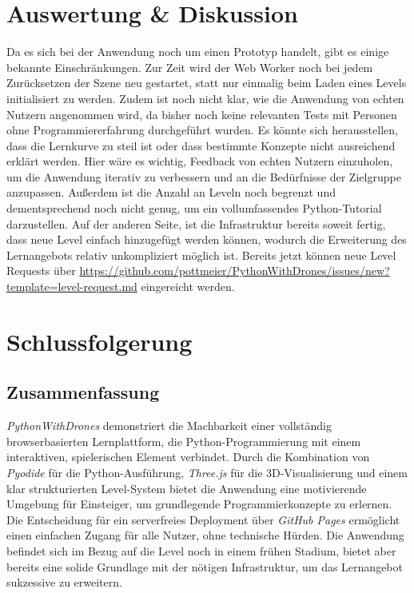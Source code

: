 \documentclass[a4paper,12pt]{article}
\begin{document}
	\section{Auswertung \& Diskussion}
	Da es sich bei der Anwendung noch um einen Prototyp handelt, gibt es einige bekannte Einschränkungen. 
	Zur Zeit wird der Web Worker noch bei jedem Zurücksetzen der Szene neu gestartet, statt 
	nur einmalig beim Laden eines Levels initialisiert zu werden. Zudem ist noch nicht klar, 
	wie die Anwendung von echten Nutzern angenommen wird, da bisher noch keine relevanten Tests 
	mit Personen ohne Programmiererfahrung durchgeführt wurden. Es könnte sich herausstellen, 
	dass die Lernkurve zu steil ist oder dass bestimmte Konzepte nicht ausreichend erklärt werden. 
	Hier wäre es wichtig, Feedback von echten Nutzern einzuholen, um die Anwendung iterativ zu 
	verbessern und an die Bedürfnisse der Zielgruppe anzupassen. Außerdem ist die Anzahl an Leveln 
	noch begrenzt und dementsprechend noch nicht genug, um ein vollumfassendes Python-Tutorial darzustellen. 
	Auf der anderen Seite, ist die Infrastruktur bereits soweit fertig, dass neue Level einfach hinzugefügt 
	werden können, wodurch die Erweiterung des Lernangebots relativ unkompliziert möglich ist. Bereits jetzt 
	können neue Level Requests über \url{https://github.com/pottmeier/PythonWithDrones/issues/new?template=level-request.md} 
	eingereicht werden.

	\section{Schlussfolgerung}
	\subsection{Zusammenfassung}
	\textit{PythonWithDrones} demonstriert die Machbarkeit einer vollständig browserbasierten Lernplattform,
	die Python-Programmierung mit einem interaktiven, spielerischen Element verbindet. Durch die Kombination von 
	\textit{Pyodide} für die Python-Ausführung, \textit{Three.js} für die 3D-Visualisierung und einem klar strukturierten 
	Level-System bietet die Anwendung eine motivierende Umgebung für Einsteiger, um grundlegende Programmierkonzepte 
	zu erlernen. Die Entscheidung für ein serverfreies Deployment über \textit{GitHub Pages} ermöglicht einen einfachen Zugang 
	für alle Nutzer, ohne technische Hürden. Die Anwendung befindet sich im Bezug auf die Level noch in einem frühen Stadium, 
	bietet aber bereits eine solide Grundlage mit der nötigen Infrastruktur, um das Lernangebot sukzessive zu erweitern.
	
\end{document}

